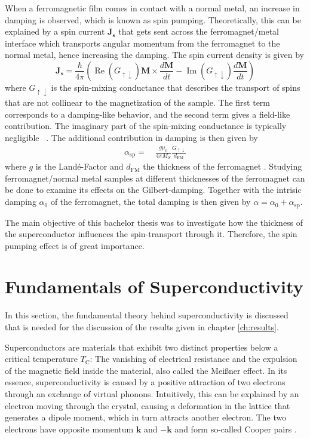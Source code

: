 When a ferromagnetic film comes in contact with a normal metal, an increase in damping is observed, which is known as spin pumping. Theoretically, this can be explained by a spin current $\mathbf{J_\textbf{s}}$ that gets sent across the ferromagnet/metal interface which transports angular momentum from the ferromagnet to the normal metal, hence increasing the damping. The spin current density is given by \cite{Mueller2023}
\begin{equation}
\mathbf{J}_{\mathbf{s}}=\frac{\hbar}{4 \pi}\left(\operatorname{Re}\left(G_{\uparrow \downarrow}\right) \mathbf{M} \times \frac{d \mathbf{M}}{d t}-\operatorname{Im}\left(G_{\uparrow \downarrow}\right) \frac{d \mathbf{M}}{d t}\right)
\end{equation}
where $G_{\uparrow \downarrow}$ is the spin-mixing conductance that describes the transport of spins that are not collinear to the magnetization of the sample. The first term corresponds to a damping-like behavior, and the second term gives a field-like contribution. The imaginary part of the spin-mixing conductance is typically negligible ~\cite{obstbaum2014}. The additional contribution in damping is then given by 
\begin{align*}
    \alpha_{\textrm{sp}} =& \ \frac{g\mu_0}{4 \pi M_S}\frac{G_{\uparrow \downarrow}}{d_{\text{FM}}}
\end{align*}
where $g$ is the Landé-Factor and $d_\textrm{FM}$ the thickness of the ferromagnet \cite{Mueller2023}. Studying ferromagnet/normal metal samples at different thicknesses of the ferromagnet can be done to examine its effects on the Gilbert-damping. Together with the intrisic damping $\alpha_0$ of the ferromagnet, the total damping is then given by $\alpha = \alpha_0 + \alpha_{\textrm{sp}}$.

The main objective of this bachelor thesis was to investigate how the thickness of the superconductor influences the spin-transport through it. Therefore, the spin pumping effect is of great importance.

\section{Fundamentals of Superconductivity}
In this section, the fundamental theory behind superconductivity is discussed that is needed for the discussion of the results given in chapter \ref{ch:results}.

Superconductors are materials that exhibit two distinct properties below a critical temperature $T_\textrm{C}$: The vanishing of electrical resistance and the expulsion of the magnetic field inside the material, also called the Meißner effect. In its essence, superconductivity is caused by a positive attraction of two electrons through an exchange of virtual phonons. Intuitively, this can be explained by an electron moving through the crystal, causing a deformation in the lattice that generates a dipole moment, which in turn attracts another electron. The two electrons have opposite momentum $\mathbf{k}$ and $\mathbf{-k}$ and form so-called Cooper pairs \cite{Hunklinger2018}. 

